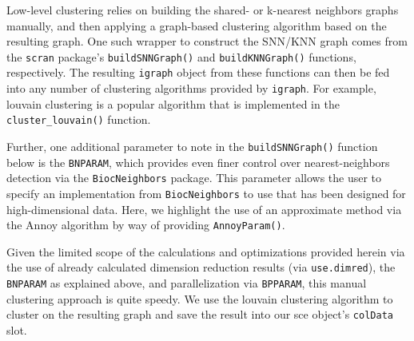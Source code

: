 \documentclass[]{book}
\newenvironment{Shaded}{\begin{snugshade}}{\end{snugshade}}
\newcommand{\DataTypeTok}[1]{\textcolor[rgb]{0.13,0.29,0.53}{#1}}
\newcommand{\DecValTok}[1]{\textcolor[rgb]{0.00,0.00,0.81}{#1}}
\newcommand{\KeywordTok}[1]{\textcolor[rgb]{0.13,0.29,0.53}{\textbf{#1}}}
\newcommand{\NormalTok}[1]{#1}
\newcommand{\OperatorTok}[1]{\textcolor[rgb]{0.81,0.36,0.00}{\textbf{#1}}}
\newcommand{\StringTok}[1]{\textcolor[rgb]{0.31,0.60,0.02}{#1}}
\begin{document}
Low-level clustering relies on building the shared- or k-nearest neighbors graphs manually, and then applying a graph-based clustering algorithm based on the resulting graph. One such wrapper to construct the SNN/KNN graph comes from the \texttt{scran} package's \texttt{buildSNNGraph()} and \texttt{buildKNNGraph()} functions, respectively. The resulting \texttt{igraph} object from these functions can then be fed into any number of clustering algorithms provided by \texttt{igraph}. For example, louvain clustering is a popular algorithm that is implemented in the \texttt{cluster\_louvain()} function.

Further, one additional parameter to note in the \texttt{buildSNNGraph()} function below is the \texttt{BNPARAM}, which provides even finer control over nearest-neighbors detection via the \texttt{BiocNeighbors} package. This parameter allows the user to specify an implementation from \texttt{BiocNeighbors} to use that has been designed for high-dimensional data. Here, we highlight the use of an approximate method via the Annoy algorithm by way of providing \texttt{AnnoyParam()}.

Given the limited scope of the calculations and optimizations provided herein via the use of already calculated dimension reduction results (via \texttt{use.dimred}), the \texttt{BNPARAM} as explained above, and parallelization via \texttt{BPPARAM}, this manual clustering approach is quite speedy. We use the louvain clustering algorithm to cluster on the resulting graph and save the result into our sce object's \texttt{colData} slot.

\begin{Shaded}
\end{Shaded}
\end{document}
